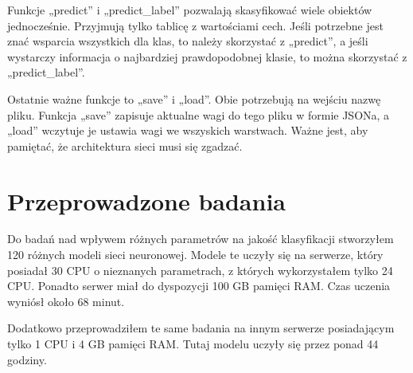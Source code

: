 \documentclass{report}
\begin{document}
    Funkcje „predict” i „predict\_label” pozwalają skasyfikować wiele obiektów jednocześnie.
    Przyjmują tylko tablicę z wartościami cech.
    Jeśli potrzebne jest znać wsparcia wszystkich dla klas, to należy skorzystać z „predict”, a jeśli wystarczy informacja o najbardziej prawdopodobnej klasie, to można skorzystać z „predict\_label”.

    Ostatnie ważne funkcje to „save” i „load”.
    Obie potrzebują na wejściu nazwę pliku.
    Funkcja „save” zapisuje aktualne wagi do tego pliku w formie JSONa, a „load” wczytuje je ustawia wagi we wszyskich warstwach.
    Ważne jest, aby pamiętać, że architektura sieci musi się zgadzać.

    \chapter{Przeprowadzone badania}\label{ch:przeprowadzoneBadania}

    Do badań nad wpływem różnych parametrów na jakość klasyfikacji stworzyłem 120 różnych modeli sieci neuronowej.
    Modele te uczyły się na serwerze, który posiadał 30 CPU o nieznanych parametrach, z których wykorzystałem tylko 24 CPU.
    Ponadto serwer miał do dyspozycji 100 GB pamięci RAM.
    Czas uczenia wyniósł około 68 minut.

    Dodatkowo przeprowadziłem te same badania na innym serwerze posiadającym tylko 1 CPU i 4 GB pamięci RAM.
    Tutaj modelu uczyły się przez ponad 44 godziny.
\end{document}
